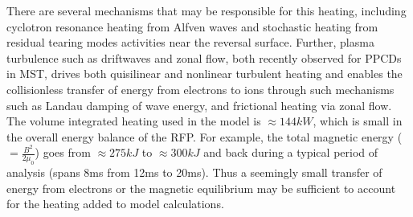 
 

There are several mechanisms that may be responsible for this \adhoc heating, including cyclotron resonance heating from Alfven waves and stochastic heating from residual tearing modes activities near the reversal surface. Further, plasma turbulence such as driftwaves and zonal flow, both recently observed for PPCDs in MST\cite{Nishizawa2018, Nishizawa2019}, drives both quisilinear and nonlinear turbulent heating and enables the collisionless transfer of energy from electrons to ions through such mechanisms such as Landau damping of wave energy, and frictional heating via zonal flow. The volume integrated \adhoc heating used in the model is $\approx 144 kW$, which is small in the overall energy balance of the RFP. For example, the total magnetic energy ($ = \frac{B^2}{2\mu_0}$) goes from $\approx 275kJ$ to $\approx 300kJ$ and back during a typical period of analysis (spans 8ms from 12ms to 20ms). Thus a seemingly small transfer of energy from electrons or the magnetic equilibrium may be sufficient to account for the \adhoc heating added to model calculations.

